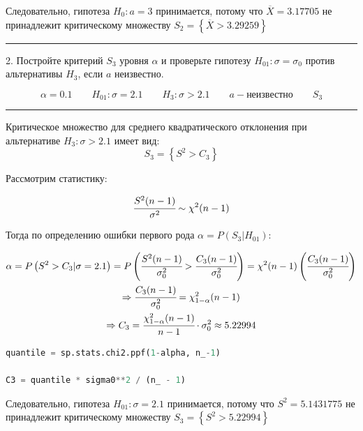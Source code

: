 \documentclass[a4paper, 14pt]{extarticle}
\begin{document}
Следовательно, гипотеза $H_0: a = 3$ принимается, потому что $\overline{X} = 3.17705$ 
не принадлежит критическому множеству $S_2 = \left\{ \overline{X} > 3.29259 \right\}$

\rule{\linewidth}{0.1mm}

2. Постройте критерий $S_3$ уровня $\alpha$ и проверьте гипотезу $H_{01}: \sigma = \sigma_0$ 
против альтернативы $H_3$, если $a$ неизвестно.

\begin{equation*}
    \alpha = 0.1 \qquad H_{01}: \sigma = 2.1 \qquad H_3: \sigma > 2.1 \qquad a - \text{неизвестно} \qquad S_3
\end{equation*}

\rule{\linewidth}{0.1mm}

Критическое множество для среднего квадратического отклонения при 
альтернативе $H_3: \sigma > 2.1$ имеет вид:
\begin{equation*}
    S_3 = \left\{ S^2 > C_3 \right\}
\end{equation*}

Рассмотрим статистику:

\begin{equation*}
    \cfrac{S^2 (n-1)}{\sigma^2} \sim \chi^2(n-1)
\end{equation*}

Тогда по определению ошибки первого рода $\alpha = P(S_3 | H_{01})$:

\begin{gather*}
    \alpha = P\left(S^2 > C_3 | \sigma = 2.1\right) = 
    P\left( \cfrac{S^2(n-1)}{\sigma_0^2} > \cfrac{C_3 (n-1)}{\sigma_0^2} \right)
    = \chi^2(n-1) \left(\cfrac{C_3 (n-1)}{\sigma_0^2}\right) \\
    \Rightarrow \cfrac{C_3 (n-1)}{\sigma_0^2} = \chi^2_{1 - \alpha}(n-1) \\
    \Rightarrow C_3 = \cfrac{\chi^2_{1 - \alpha} (n-1)}{n-1} \cdot \sigma_0^2 \approx 5.22994
\end{gather*}

\begin{center}
    \begin{lstlisting}[language=Python]
quantile = sp.stats.chi2.ppf(1-alpha, n_-1)

C3 = quantile * sigma0**2 / (n_ - 1)
    \end{lstlisting}
\end{center}

Следовательно, гипотеза $H_{01}: \sigma = 2.1$ принимается, потому что $S^2 = 5.1431775$ 
не принадлежит критическому множеству $S_3 = \left\{ S^2 > 5.22994 \right\}$
\end{document}
